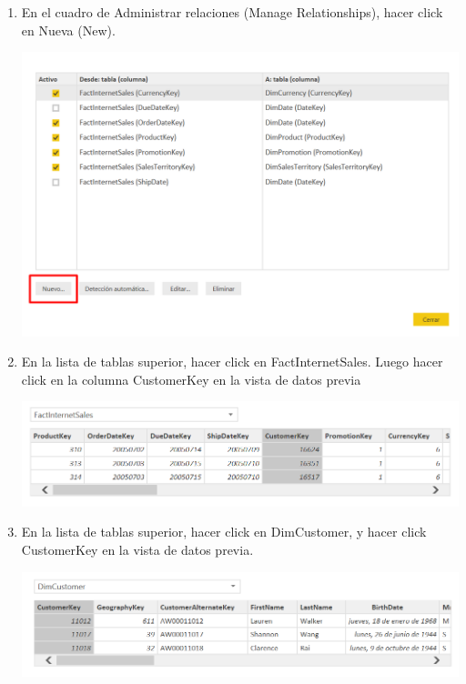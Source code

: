 \begin{itemize}
\begin{enumerate}
\item En el cuadro de Administrar relaciones (Manage Relationships), hacer click en Nueva (New).

\begin{center}
\includegraphics[scale=0.55]{./Imagenes/29.png}
\end{center}

\item En la lista de tablas superior, hacer click en FactInternetSales. Luego hacer click en la columna CustomerKey en la vista de datos previa

\begin{center}
\includegraphics[scale=0.55]{./Imagenes/30.png}
\end{center}

\item En la lista de tablas superior, hacer click en DimCustomer, y hacer click CustomerKey en la vista de datos previa.

\begin{center}
\includegraphics[scale=0.55]{./Imagenes/31.png}
\end{center}


\end{enumerate}
\end{itemize}
